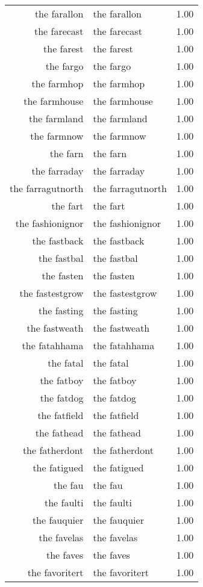 \begin{table}[ht]
\begin{tabular}{rlr}
  the farallon & the farallon & 1.00 \\ 
  the farecast & the farecast & 1.00 \\ 
  the farest & the farest & 1.00 \\ 
  the fargo & the fargo & 1.00 \\ 
  the farmhop & the farmhop & 1.00 \\ 
  the farmhouse & the farmhouse & 1.00 \\ 
  the farmland & the farmland & 1.00 \\ 
  the farmnow & the farmnow & 1.00 \\ 
  the farn & the farn & 1.00 \\ 
  the farraday & the farraday & 1.00 \\ 
  the farragutnorth & the farragutnorth & 1.00 \\ 
  the fart & the fart & 1.00 \\ 
  the fashionignor & the fashionignor & 1.00 \\ 
  the fastback & the fastback & 1.00 \\ 
  the fastbal & the fastbal & 1.00 \\ 
  the fasten & the fasten & 1.00 \\ 
  the fastestgrow & the fastestgrow & 1.00 \\ 
  the fasting & the fasting & 1.00 \\ 
  the fastweath & the fastweath & 1.00 \\ 
  the fatahhama & the fatahhama & 1.00 \\ 
  the fatal & the fatal & 1.00 \\ 
  the fatboy & the fatboy & 1.00 \\ 
  the fatdog & the fatdog & 1.00 \\ 
  the fatfield & the fatfield & 1.00 \\ 
  the fathead & the fathead & 1.00 \\ 
  the fatherdont & the fatherdont & 1.00 \\ 
  the fatigued & the fatigued & 1.00 \\ 
  the fau & the fau & 1.00 \\ 
  the faulti & the faulti & 1.00 \\ 
  the fauquier & the fauquier & 1.00 \\ 
  the favelas & the favelas & 1.00 \\ 
  the faves & the faves & 1.00 \\ 
  the favoritert & the favoritert & 1.00 \\ 

\end{tabular}
\end{table}
